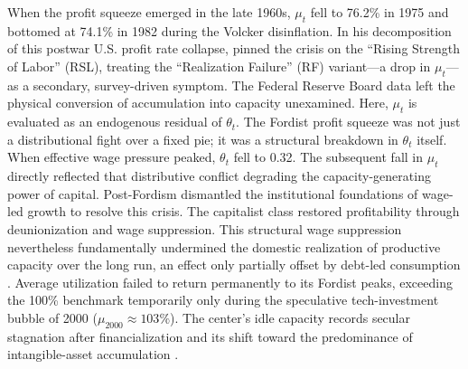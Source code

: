 When the profit squeeze emerged in the late 1960s, $\mu_t$ fell to 76.2\% in 1975 and bottomed at 74.1\% in 1982 during the Volcker disinflation. In his decomposition of this postwar U.S. profit rate collapse, \citet{Weisskopf1979} pinned the crisis on the ``Rising Strength of Labor'' (RSL), treating the ``Realization Failure'' (RF) variant—a drop in $\mu_t$—as a secondary, survey-driven symptom. The Federal Reserve Board data left the physical conversion of accumulation into capacity unexamined. Here, $\mu_t$ is evaluated as an endogenous residual of $\theta_t$. The Fordist profit squeeze was not just a distributional fight over a fixed pie; it was a structural breakdown in $\theta_t$ itself. When effective wage pressure peaked, $\theta_t$ fell to 0.32. The subsequent fall in $\mu_t$ directly reflected that distributive conflict degrading the capacity-generating power of capital. Post-Fordism dismantled the institutional foundations of wage-led growth to resolve this crisis. The capitalist class restored profitability through deunionization and wage suppression. This structural wage suppression nevertheless fundamentally undermined the domestic realization of productive capacity over the long run, an effect only partially offset by debt-led consumption \citep{Stockhammer2012,Vidal2019}. Average utilization failed to return permanently to its Fordist peaks, exceeding the 100\% benchmark temporarily only during the speculative tech-investment bubble of 2000 ($\mu_{2000} \approx 103\%$). The center's idle capacity records secular stagnation after financialization and its shift toward the predominance of intangible-asset accumulation \citep{Rikap2021, Rotta2018}.

